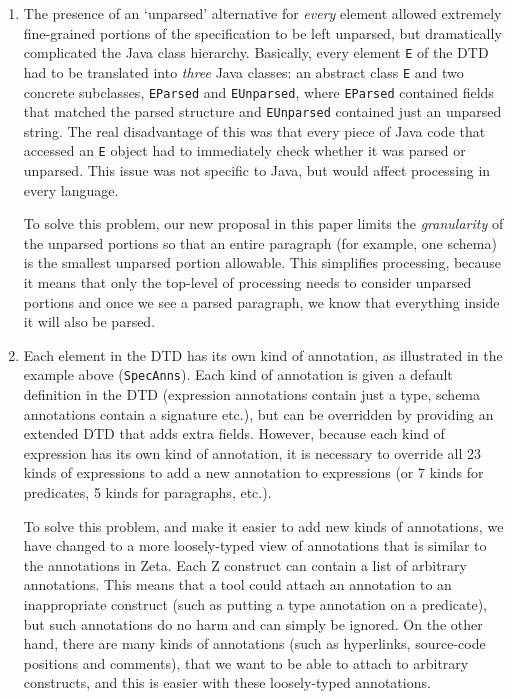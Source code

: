 \documentclass{llncs}  %
\newcommand{\Zeta}{Zeta}
\begin{document}
\begin{enumerate}
\item The presence of an `unparsed' alternative for \emph{every} element
  allowed extremely fine-grained portions of the specification to be left
  unparsed, but dramatically complicated the Java class hierarchy.
  Basically, every element \verb!E! of the DTD had to be translated into
  \emph{three} Java classes: an abstract class \verb!E! and two concrete 
  subclasses, \verb!EParsed! and \verb!EUnparsed!, where \verb!EParsed!
  contained fields that matched the parsed structure and \verb!EUnparsed!
  contained just an unparsed string.  The real disadvantage of this was
  that every piece of Java code that accessed an \verb!E! object had to
  immediately check whether it was parsed or unparsed.  This issue was not
  specific to Java, but would affect processing in every language.
  
  To solve this problem, our new proposal in this paper limits the
  \emph{granularity} of the unparsed portions so that an entire paragraph
  (for example, one schema) is the smallest
  unparsed portion allowable.  This simplifies processing, because it means
  that only the top-level of processing needs to consider unparsed portions
  and once we see a parsed paragraph, we know that everything inside it
  will also be parsed.

\item Each element in the DTD has its own kind of annotation, as
  illustrated in the example above (\verb!SpecAnns!).  Each kind of
  annotation is given 
  a default definition in the DTD (expression annotations contain just a
  type, schema annotations contain a signature etc.), but can be
  overridden by providing an extended DTD that adds extra fields.
  However, because each kind of expression has its own kind of annotation,
  it is necessary to override all 23 kinds of expressions 
  to add a new annotation to expressions (or 7 kinds for predicates, 
  5 kinds for paragraphs, etc.).
  
  To solve this problem, and make it easier to add new kinds of
  annotations, we have changed to a more loosely-typed view of annotations
  that is similar to the annotations in \Zeta.  Each Z construct can contain
  a list of arbitrary annotations.  This
  means that a tool could attach an annotation to an inappropriate
  construct (such as putting a type annotation on a predicate), but such
  annotations do no harm and can simply be ignored.  On the other hand,
  there are many kinds of annotations (such as hyperlinks, source-code
  positions and comments), that we want to be able to attach to arbitrary
  constructs, and this is easier with these loosely-typed annotations.
  

\end{enumerate}
\end{document}

